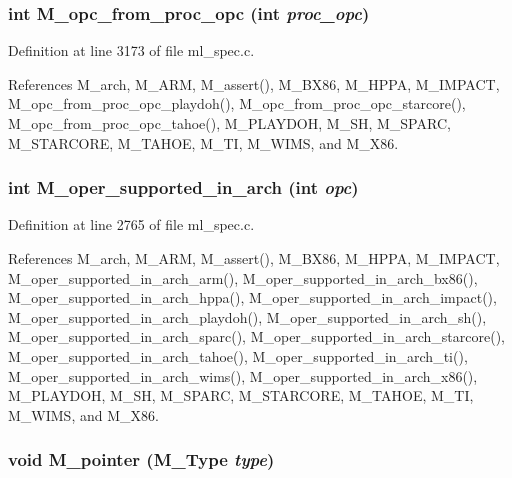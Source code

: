 \subsubsection{\setlength{\rightskip}{0pt plus 5cm}int M\_\-opc\_\-from\_\-proc\_\-opc (int {\em proc\_\-opc})}\label{m__spec_8h_15b4261108781b5e726358c1d2908c73}




Definition at line 3173 of file ml\_\-spec.c.

References M\_\-arch, M\_\-ARM, M\_\-assert(), M\_\-BX86, M\_\-HPPA, M\_\-IMPACT, M\_\-opc\_\-from\_\-proc\_\-opc\_\-playdoh(), M\_\-opc\_\-from\_\-proc\_\-opc\_\-starcore(), M\_\-opc\_\-from\_\-proc\_\-opc\_\-tahoe(), M\_\-PLAYDOH, M\_\-SH, M\_\-SPARC, M\_\-STARCORE, M\_\-TAHOE, M\_\-TI, M\_\-WIMS, and M\_\-X86.
\subsubsection{\setlength{\rightskip}{0pt plus 5cm}int M\_\-oper\_\-supported\_\-in\_\-arch (int {\em opc})}\label{m__spec_8h_cb7ed137027d04e77a3c4f746a37c9e1}




Definition at line 2765 of file ml\_\-spec.c.

References M\_\-arch, M\_\-ARM, M\_\-assert(), M\_\-BX86, M\_\-HPPA, M\_\-IMPACT, M\_\-oper\_\-supported\_\-in\_\-arch\_\-arm(), M\_\-oper\_\-supported\_\-in\_\-arch\_\-bx86(), M\_\-oper\_\-supported\_\-in\_\-arch\_\-hppa(), M\_\-oper\_\-supported\_\-in\_\-arch\_\-impact(), M\_\-oper\_\-supported\_\-in\_\-arch\_\-playdoh(), M\_\-oper\_\-supported\_\-in\_\-arch\_\-sh(), M\_\-oper\_\-supported\_\-in\_\-arch\_\-sparc(), M\_\-oper\_\-supported\_\-in\_\-arch\_\-starcore(), M\_\-oper\_\-supported\_\-in\_\-arch\_\-tahoe(), M\_\-oper\_\-supported\_\-in\_\-arch\_\-ti(), M\_\-oper\_\-supported\_\-in\_\-arch\_\-wims(), M\_\-oper\_\-supported\_\-in\_\-arch\_\-x86(), M\_\-PLAYDOH, M\_\-SH, M\_\-SPARC, M\_\-STARCORE, M\_\-TAHOE, M\_\-TI, M\_\-WIMS, and M\_\-X86.
\subsubsection{\setlength{\rightskip}{0pt plus 5cm}void M\_\-pointer (\bf{M\_\-Type} {\em type})}\label{m__spec_8h_5062b86f17dd667ea4c82e7bec27ddb0}




